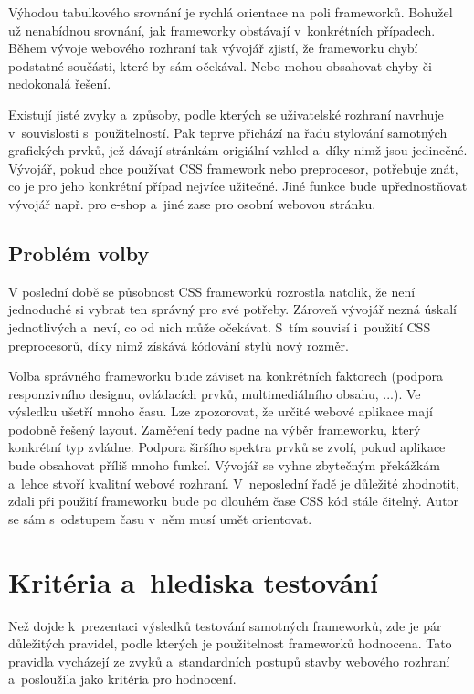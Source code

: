 \documentclass[thesis=B,czech]{FITthesis}[2012/06/26]
\begin{document}
Výhodou tabulkového srovnání je rychlá orientace na poli frameworků. Bohužel už nenabídnou srovnání, jak frameworky obstávají v~konkrétních případech. Během vývoje webového rozhraní tak vývojář zjistí, že frameworku chybí podstatné součásti, které by sám očekával. Nebo mohou obsahovat chyby či nedokonalá řešení. 

Existují jisté zvyky a~způsoby, podle kterých se uživatelské rozhraní navrhuje v~souvislosti s~použitelností. Pak teprve přichází na řadu stylování samotných grafických prvků, jež dávají stránkám origiální vzhled a~díky nimž jsou jedinečné. Vývojář, pokud chce používat \gls{CSS} framework nebo preprocesor, potřebuje znát, co je pro jeho konkrétní případ nejvíce užitečné. Jiné funkce bude upřednostňovat vývojář např. pro e-shop a~jiné zase pro osobní webovou stránku.


\section{Problém volby}

V poslední době se působnost \gls{CSS} frameworků rozrostla natolik, že není jednoduché si vybrat ten správný pro své potřeby. Zároveň vývojář nezná úskalí jednotlivých a~neví, co od nich může očekávat. S~tím souvisí i~použití \gls{CSS} preprocesorů, díky nimž získává kódování stylů nový rozměr. 

Volba správného frameworku bude záviset na konkrétních faktorech (podpora responzivního designu, ovládacích prvků, multimediálního obsahu, ...). Ve výsledku ušetří mnoho času. Lze zpozorovat, že určité webové aplikace mají podobně řešený layout. Zaměření tedy padne na výběr frameworku, který konkrétní typ zvládne. Podpora širšího spektra prvků se zvolí, pokud aplikace bude obsahovat příliš mnoho funkcí. Vývojář se vyhne zbytečným překážkám a~lehce stvoří kvalitní webové rozhraní. V~neposlední řadě je důležité zhodnotit, zdali při použití frameworku bude po dlouhém čase \gls{CSS} kód stále čitelný. Autor se sám s~odstupem času v~něm musí umět orientovat.



\chapter{Kritéria a~hlediska testování}
\label{sec:hod}
Než dojde k~prezentaci výsledků testování samotných frameworků, zde je pár důležitých pravidel, podle kterých je použitelnost frameworků hodnocena. Tato pravidla vycházejí ze zvyků a~standardních postupů stavby webového rozhraní a~posloužila jako kritéria pro hodnocení.
\end{document}
